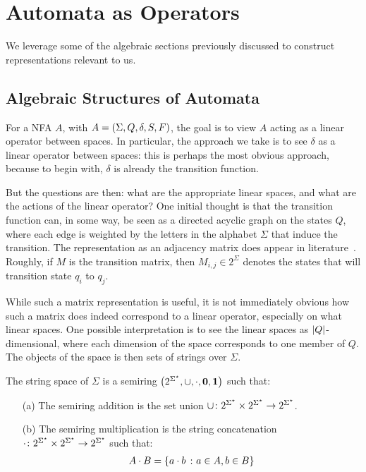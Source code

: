 \documentclass[12pt]{article}
\begin{document}
\section{Automata as Operators}

We leverage some of the algebraic sections previously discussed to
construct representations relevant to us.

\subsection{Algebraic Structures of Automata}

For a NFA \(A\), with \(A = \left(\Sigma, Q, \delta, S, F\right)\),
the goal is to view \(A\) acting as a linear operator between spaces.
In particular, the approach we take is to see \(\delta\) as a
linear operator between spaces: this is perhaps the most obvious approach,
because to begin with, \(\delta\) is already the transition function.

But the questions are then:
what are the appropriate linear spaces,
and what are the actions of the linear operator?
One initial thought is that the transition function can, in some way,
be seen as a directed acyclic graph on the states \(Q\),
where each edge is weighted by the letters in the alphabet \(\Sigma\)
that induce the transition.
The representation as an adjacency matrix does appear in
literature~\cite{savage1998models}.
Roughly, if \(M\) is the transition matrix, then \(M_{i, j} \in 2^{\Sigma}\)
denotes the states that will transition state \(q_i\) to \(q_j\).

While such a matrix representation is useful,
it is not immediately obvious how such a matrix does indeed correspond
to a linear operator, especially on what linear spaces.
One possible interpretation is to see
the linear spaces as \(\left\lvert Q\right\rvert\)-dimensional,
where each dimension of the space corresponds to one member of \(Q\).
The objects of the space is then sets of strings over \(\Sigma\).

\begin{definition}
  The string space of \(\Sigma\) is a semiring
  \(\left(2^{\Sigma^\star}, \cup, \cdot, \mathbf{0}, \mathbf{1}\right)\)
  such that:
  \begin{enumerate}
    \item[(a)]
      The semiring addition is the set union
      \(\cup \colon 2^{\Sigma^\star} \times
        2^{\Sigma^\star} \to 2^{\Sigma^\star}\).

    \item[(b)]
      The semiring multiplication is the string concatenation
      \(\cdot \colon 2^{\Sigma^\star} \times
        2^{\Sigma^\star} \to 2^{\Sigma^\star}\)
      such that:
      \begin{align*}
        A \cdot B
          = \left\{a \cdot b \ \colon a \in A, b \in B\right\}
      \end{align*}
  \end{enumerate}
\end{definition}
\end{document}
